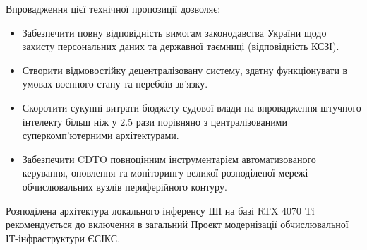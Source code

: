\documentclass{article}
\begin{document}
Впровадження цієї технічної пропозиції дозволяє:
\begin{itemize}
\item Забезпечити повну відповідність вимогам законодавства України щодо захисту персональних даних та державної таємниці (відповідність КСЗІ).
\item Створити відмовостійку децентралізовану систему, здатну функціонувати в умовах воєнного стану та перебоїв зв'язку.
\item Скоротити сукупні витрати бюджету судової влади на впровадження штучного інтелекту більш ніж у 2.5 рази порівняно з централізованими суперкомп'ютерними архітектурами.
\item Забезпечити CDTO повноцінним інструментарієм автоматизованого керування, оновлення та моніторингу великої розподіленої мережі обчислювальних вузлів периферійного контуру.
\end{itemize}

Розподілена архітектура локального інференсу ШІ на базі RTX 4070 Ti рекомендується до включення в загальний Проект модернізації обчислювальної ІТ-інфраструктури ЄСІКС.
\end{document}
